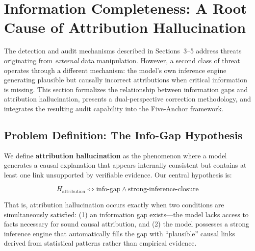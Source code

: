 
\section{Information Completeness: A Root Cause of Attribution Hallucination}
\label{sec:info-completeness}

The detection and audit mechanisms described in Sections~3--5 address threats 
originating from \textit{external} data manipulation. However, a second class of 
threat operates through a different mechanism: the model's own inference engine 
generating plausible but causally incorrect attributions when critical information 
is missing. This section formalizes the relationship between information gaps and 
attribution hallucination, presents a dual-perspective correction methodology, and 
integrates the resulting audit capability into the Five-Anchor framework.

\subsection{Problem Definition: The Info-Gap Hypothesis}

We define \textbf{attribution hallucination} as the phenomenon where a model 
generates a causal explanation that appears internally consistent but contains 
at least one link unsupported by verifiable evidence. Our central hypothesis is:

\begin{equation}
\label{eq:attribution}
H_{\text{attribution}} \Longleftrightarrow \text{info-gap} \land \text{strong-inference-closure}
\end{equation}

That is, attribution hallucination occurs exactly when two conditions are 
simultaneously satisfied: (1) an information gap exists---the model lacks access 
to facts necessary for sound causal attribution, and (2) the model possesses a 
strong inference engine that automatically fills the gap with ``plausible'' 
causal links derived from statistical patterns rather than empirical evidence.

